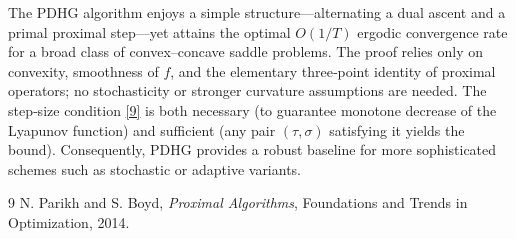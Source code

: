 \documentclass{article}
\begin{document}
The PDHG algorithm enjoys a simple structure—alternating a dual ascent and a primal proximal step—yet attains the optimal $O(1/T)$ ergodic convergence rate for a broad class of convex–concave saddle problems. The proof relies only on convexity, smoothness of $f$, and the elementary three‑point identity of proximal operators; no stochasticity or stronger curvature assumptions are needed. The step‑size condition \eqref{9} is both necessary (to guarantee monotone decrease of the Lyapunov function) and sufficient (any pair $(\tau,\sigma)$ satisfying it yields the bound). Consequently, PDHG provides a robust baseline for more sophisticated schemes such as stochastic or adaptive variants.

\begin{thebibliography}{9}
N. Parikh and S. Boyd, \emph{Proximal Algorithms}, Foundations and Trends in Optimization, 2014.
\end{thebibliography}
\end{document}
